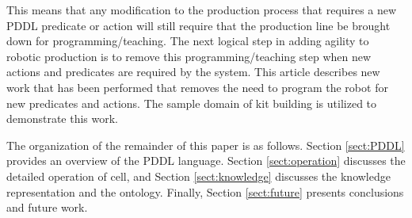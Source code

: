 This means that any
modification to the production process that requires a new
PDDL predicate or action will still require that the production 
line be brought down for programming/teaching. The next logical step
in adding agility to robotic production is to remove this 
programming/teaching step when new actions and predicates
are required by the system. This article describes new work
that has been performed that removes the need to program
the robot for new predicates and actions. The sample domain of kit building is utilized
to demonstrate this work.

The organization of the remainder of this paper is as follows.
Section \ref{sect:PDDL} provides an overview of the PDDL language. 
Section \ref{sect:operation} discusses the detailed operation of cell, and Section \ref{sect:knowledge} discusses the knowledge representation and
the ontology. Finally, Section \ref{sect:future} presents
conclusions and future work.
%
